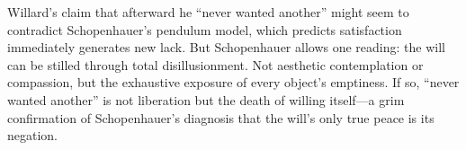 Willard's claim that afterward he ``never wanted another'' might seem to contradict
Schopenhauer's pendulum model, which predicts satisfaction immediately generates new lack. But
Schopenhauer allows one reading: the will can be stilled through total disillusionment. Not
aesthetic contemplation or compassion, but the exhaustive exposure of every object's
emptiness. If so, ``never wanted another'' is not liberation but the death of willing
itself---a grim confirmation of Schopenhauer's diagnosis that the will's only true peace is
its negation.
